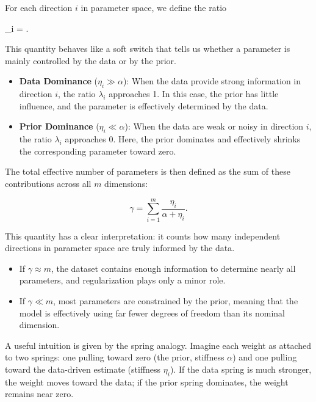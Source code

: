 For each direction $i$ in parameter space, we define the ratio

\begin{myequation}
\lambda_i = .
\end{myequation}

This quantity behaves like a soft switch that tells us whether a parameter is mainly controlled by the data or by the prior.

\begin{itemize}
    \item \textbf{Data Dominance} ($\eta_i \gg \alpha$):  
    When the data provide strong information in direction $i$, the ratio $\lambda_i$ approaches 1. In this case, the prior has little influence, and the parameter is effectively determined by the data.

    \item \textbf{Prior Dominance} ($\eta_i \ll \alpha$):  
    When the data are weak or noisy in direction $i$, the ratio $\lambda_i$ approaches 0. Here, the prior dominates and effectively shrinks the corresponding parameter toward zero.
\end{itemize}

\medskip
The total effective number of parameters is then defined as the sum of these contributions across all $m$ dimensions:

\[
\gamma = \sum_{i=1}^m \frac{\eta_i}{\alpha + \eta_i}.
\]

This quantity has a clear interpretation: it counts how many independent directions in parameter space are truly informed by the data.

\begin{itemize}
    \item If $\gamma \approx m$, the dataset contains enough information to determine nearly all parameters, and regularization plays only a minor role.
    \item If $\gamma \ll m$, most parameters are constrained by the prior, meaning that the model is effectively using far fewer degrees of freedom than its nominal dimension.
\end{itemize}

\medskip
A useful intuition is given by the spring analogy. Imagine each weight as attached to two springs: one pulling toward zero (the prior, stiffness $\alpha$) and one pulling toward the data-driven estimate (stiffness $\eta_i$). If the data spring is much stronger, the weight moves toward the data; if the prior spring dominates, the weight remains near zero.

